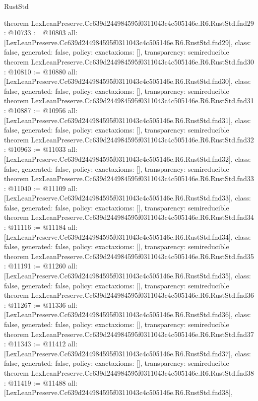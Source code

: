 \begin{lexlean}{RustStd}
\begin{coremodule}
{}
theorem LexLeanPreserve.Cc639d244984595f0311043c4c505146e.R6.RustStd.fnd29 : @10733 := @10803 {
  all: [LexLeanPreserve.Cc639d244984595f0311043c4c505146e.R6.RustStd.fnd29],
  class: false,
  generated: false,
  policy: exact{axioms: []},
  transparency: semireducible
}
theorem LexLeanPreserve.Cc639d244984595f0311043c4c505146e.R6.RustStd.fnd30 : @10810 := @10880 {
  all: [LexLeanPreserve.Cc639d244984595f0311043c4c505146e.R6.RustStd.fnd30],
  class: false,
  generated: false,
  policy: exact{axioms: []},
  transparency: semireducible
}
theorem LexLeanPreserve.Cc639d244984595f0311043c4c505146e.R6.RustStd.fnd31 : @10887 := @10956 {
  all: [LexLeanPreserve.Cc639d244984595f0311043c4c505146e.R6.RustStd.fnd31],
  class: false,
  generated: false,
  policy: exact{axioms: []},
  transparency: semireducible
}
theorem LexLeanPreserve.Cc639d244984595f0311043c4c505146e.R6.RustStd.fnd32 : @10963 := @11033 {
  all: [LexLeanPreserve.Cc639d244984595f0311043c4c505146e.R6.RustStd.fnd32],
  class: false,
  generated: false,
  policy: exact{axioms: []},
  transparency: semireducible
}
theorem LexLeanPreserve.Cc639d244984595f0311043c4c505146e.R6.RustStd.fnd33 : @11040 := @11109 {
  all: [LexLeanPreserve.Cc639d244984595f0311043c4c505146e.R6.RustStd.fnd33],
  class: false,
  generated: false,
  policy: exact{axioms: []},
  transparency: semireducible
}
theorem LexLeanPreserve.Cc639d244984595f0311043c4c505146e.R6.RustStd.fnd34 : @11116 := @11184 {
  all: [LexLeanPreserve.Cc639d244984595f0311043c4c505146e.R6.RustStd.fnd34],
  class: false,
  generated: false,
  policy: exact{axioms: []},
  transparency: semireducible
}
theorem LexLeanPreserve.Cc639d244984595f0311043c4c505146e.R6.RustStd.fnd35 : @11191 := @11260 {
  all: [LexLeanPreserve.Cc639d244984595f0311043c4c505146e.R6.RustStd.fnd35],
  class: false,
  generated: false,
  policy: exact{axioms: []},
  transparency: semireducible
}
theorem LexLeanPreserve.Cc639d244984595f0311043c4c505146e.R6.RustStd.fnd36 : @11267 := @11336 {
  all: [LexLeanPreserve.Cc639d244984595f0311043c4c505146e.R6.RustStd.fnd36],
  class: false,
  generated: false,
  policy: exact{axioms: []},
  transparency: semireducible
}
theorem LexLeanPreserve.Cc639d244984595f0311043c4c505146e.R6.RustStd.fnd37 : @11343 := @11412 {
  all: [LexLeanPreserve.Cc639d244984595f0311043c4c505146e.R6.RustStd.fnd37],
  class: false,
  generated: false,
  policy: exact{axioms: []},
  transparency: semireducible
}
theorem LexLeanPreserve.Cc639d244984595f0311043c4c505146e.R6.RustStd.fnd38 : @11419 := @11488 {
  all: [LexLeanPreserve.Cc639d244984595f0311043c4c505146e.R6.RustStd.fnd38],
}
\end{coremodule}
\end{lexlean}
